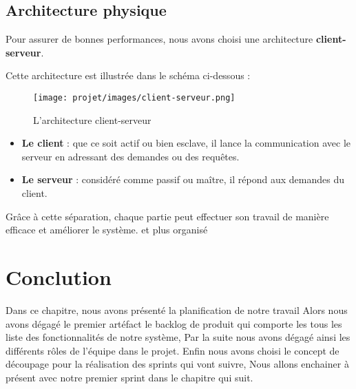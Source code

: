 \subsection{Architecture physique}
Pour assurer de bonnes performances, nous avons choisi une architecture
\textbf{client-serveur}.

Cette architecture est illustrée dans le schéma ci-dessous :

\begin{figure}[H]
    \centering
    \texttt{[image: projet/images/client-serveur.png]}
    \caption{L’architecture client-serveur}
    \label{fig:equipe_scrum}
\end{figure}

\begin{itemize}
    \item \textbf{Le client} : que ce soit actif ou bien esclave, il lance la communication avec le serveur en adressant des demandes ou des requêtes.
    \item \textbf{Le serveur} : considéré comme passif ou maître, il répond aux demandes du client.
\end{itemize}

Grâce à cette séparation, chaque partie peut effectuer son travail de manière efficace et améliorer le système.
et plus organisé\\
\section*{Conclution}
Dans ce chapitre, nous avons présenté la planification de notre travail Alors
nous avons dégagé le premier artéfact le backlog de produit qui comporte les tous les liste des fonctionnalités de notre système, Par la suite nous avons dégagé ainsi les différents rôles de l’équipe dans le projet. Enfin nous avons choisi le concept de découpage pour la réalisation des sprints qui vont suivre, Nous allons enchainer à présent avec notre premier sprint dans le
chapitre qui suit.